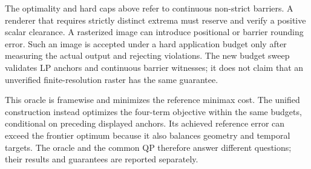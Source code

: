 The optimality and hard caps above refer to continuous non-strict barriers. A renderer that requires strictly distinct extrema must reserve and verify a positive scalar clearance. A rasterized image can introduce positional or barrier rounding error. Such an image is accepted under a hard application budget only after measuring the actual output and rejecting violations. The new budget sweep validates LP anchors and continuous barrier witnesses; it does not claim that an unverified finite-resolution raster has the same guarantee.

This oracle is framewise and minimizes the reference minimax cost. The unified construction instead optimizes the four-term objective within the same budgets, conditional on preceding displayed anchors. Its achieved reference error can exceed the frontier optimum because it also balances geometry and temporal targets. The oracle and the common QP therefore answer different questions; their results and guarantees are reported separately.

